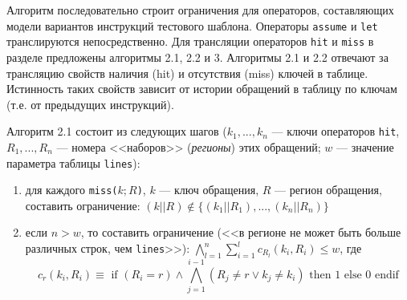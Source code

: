 \documentclass[14pt,autoref,href
,facsimile
]{disser}
\begin{document}
Алгоритм последовательно строит ограничения для операторов, составляющих модели вариантов инструкций тестового шаблона. Операторы \texttt{assume} и \texttt{let} транслируются непосредственно. Для трансляции операторов \texttt{hit} и \texttt{miss} в разделе предложены алгоритмы 2.1, 2.2 и 3. Алгоритмы 2.1 и 2.2 отвечают за трансляцию свойств наличия (hit) и отсутствия (miss) ключей в таблице. Истинность таких свойств зависит от истории обращений в таблицу по ключам (т.е. от предыдущих инструкций).

Алгоритм 2.1 состоит из следующих шагов ($k_1, ..., k_n$ --- ключи операторов \texttt{hit}, $R_1, ..., R_n$ --- номера <<наборов>> (\emph{регионы}) этих обращений; $w$ --- значение параметра таблицы \texttt{lines}):

\begin{enumerate}
    \item для каждого \texttt{miss($k; R$)}, $k$ --- ключ обращения, $R$ --- регион
обращения, составить ограничение: $(k||R) \notin \{(k_1||R_1), ..., (k_n||R_n)
\}$

    \item если $n > w$, то составить
ограничение (<<в регионе не может быть больше различных строк, чем \texttt{lines}>>):
$\bigwedge_{l=1}^n \sum_{i=1}^l c_{R_l} (k_i, R_i) \leqslant w$, где
$$c_r (k_i, R_i) \equiv \mbox{~if~} (R_i = r ) \wedge \bigwedge_{j=1}^{i-1} (R_j
\neq r \vee k_j \neq k_i) \mbox{~then~} 1 \mbox{~else~} 0 \mbox{~endif}$$
\end{enumerate}
\end{document}
